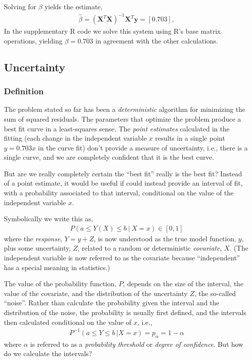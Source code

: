 \documentclass[11pt,a4paper]{article}
\begin{document}
Solving for \(\beta\) yields the estimate,
\begin{align}
\widehat{\beta} = 
\left( \boldsymbol{X}^{T}\boldsymbol{X} \right)^{- 1}\boldsymbol{X}^{T}\boldsymbol{y} = [ 0.703],
\end{align}
In the supplementary R code we solve this system using R's base matrix operations,
yielding \(\beta = 0.703\) in agreement with the other calculations.

\subsection{Uncertainty}

\subsubsection{Definition}

The problem stated so far has been a \emph{deterministic} algorithm for
minimizing the sum of squared residuals. 
The parameters that optimize
the problem produce a best fit curve in a least-squares sense. 
The \emph{point estimates} calculated in the fitting 
(each change in the independent variable \(x\) results in a single point \(y = 0.703x\) in
the curve fit) don't provide a measure of uncertainty, i.e., there is a
single curve, and we are completely confident that it is the best curve.

But are we really completely certain the ``best fit'' really is the best fit? 
Instead of a point estimate, 
it would be useful if could instead provide an interval of fit, 
with a probability associated to that interval, 
conditional on the value of the independent variable \(x\).

Symbolically we write this as,
\begin{align}
P\left( a \leq Y(X) \leq b\ |\ X = x\right) \in [0,1]
\end{align}
where the \emph{response}, \(Y=y+Z\), is now understood as the true
model function, \(y\), plus some uncertainty, \(Z\), 
related to a random or deterministic \emph{covariate}, \(X\). 
(The independent variable is now referred to as the covariate 
because ``independent'' has a special meaning in statistics.)

The value of the probability function, \(P\), 
depends on the size of the interval, 
the value of the covariate, 
and the distribution of the uncertainty \(Z\), 
the so-called ``noise''. 
Rather than calculate the probability given 
the interval and the distribution of the noise, 
the probability is usually first defined, 
and the intervals then calculated
conditional on the value of \(x\), i.e.,
\begin{align}
P^{- 1}(a \leq Y \leq b\ |X = x) = p_{\alpha} = 1 - \alpha
\end{align}
where \(\alpha\) is referred to as a \emph{probability threshold} or 
\emph{degree of confidence}. 
But how do we calculate the intervals?
\end{document}
